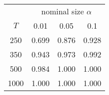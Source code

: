 % 
\begin{tabular}{cccc}
  \hline
  & \multicolumn{3}{c}{nominal size $\alpha$} \\
 $T$ & 0.01 & 0.05 & 0.1 \\
 \hline
250 & 0.699 & 0.876 & 0.928 \\ 
  350 & 0.943 & 0.973 & 0.992 \\ 
  500 & 0.984 & 1.000 & 1.000 \\ 
  1000 & 1.000 & 1.000 & 1.000 \\ 
   \hline
\end{tabular}
